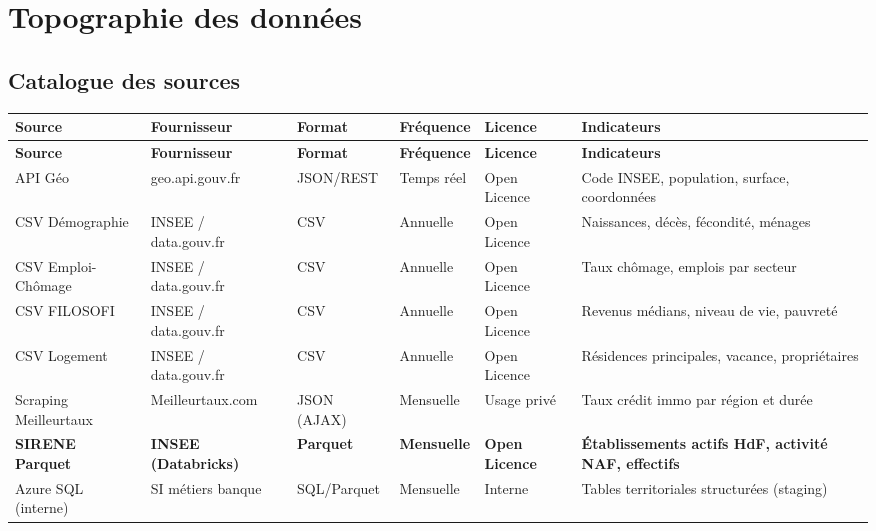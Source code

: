 \documentclass[11pt,a4paper]{article}
\begin{document}
\section{Topographie des données}

\subsection{Catalogue des sources}

\begin{longtable}{L{2.8cm} L{2cm} L{1.8cm} L{2cm} L{1.5cm} L{3.2cm}}
  \toprule
  \textbf{Source} & \textbf{Fournisseur} & \textbf{Format} & \textbf{Fréquence} & \textbf{Licence} & \textbf{Indicateurs} \\
  \midrule
  \endfirsthead
  \toprule
  \textbf{Source} & \textbf{Fournisseur} & \textbf{Format} & \textbf{Fréquence} & \textbf{Licence} & \textbf{Indicateurs} \\
  \midrule
  \endhead
  \bottomrule
  \endfoot

  API Géo & geo.api.gouv.fr & JSON/REST & Temps réel & Open Licence & Code INSEE, population, surface, coordonnées \\[0.4em]
  CSV Démographie & INSEE / data.gouv.fr & CSV & Annuelle & Open Licence & Naissances, décès, fécondité, ménages \\[0.4em]
  CSV Emploi-Chômage & INSEE / data.gouv.fr & CSV & Annuelle & Open Licence & Taux chômage, emplois par secteur \\[0.4em]
  CSV FILOSOFI & INSEE / data.gouv.fr & CSV & Annuelle & Open Licence & Revenus médians, niveau de vie, pauvreté \\[0.4em]
  CSV Logement & INSEE / data.gouv.fr & CSV & Annuelle & Open Licence & Résidences principales, vacance, propriétaires \\[0.4em]
  Scraping Meilleurtaux & Meilleurtaux.com & JSON (AJAX) & Mensuelle & Usage privé & Taux crédit immo par région et durée \\[0.4em]
  \textbf{SIRENE Parquet} & \textbf{INSEE (Databricks)} & \textbf{Parquet} & \textbf{Mensuelle} & \textbf{Open Licence} & \textbf{Établissements actifs HdF, activité NAF, effectifs} \\[0.4em]
  Azure SQL (interne) & SI métiers banque & SQL/Parquet & Mensuelle & Interne & Tables territoriales structurées (staging) \\
\end{longtable}
\end{document}
